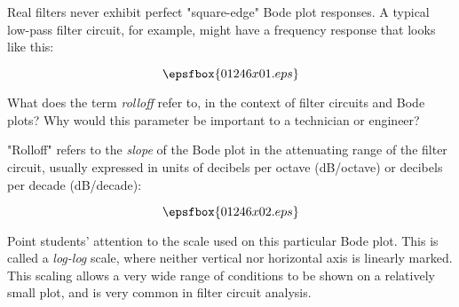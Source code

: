 

Real filters never exhibit perfect "square-edge" Bode plot responses.  A typical low-pass filter circuit, for example, might have a frequency response that looks like this:

$$\epsfbox{01246x01.eps}$$

What does the term {\it rolloff} refer to, in the context of filter circuits and Bode plots?  Why would this parameter be important to a technician or engineer?







"Rolloff" refers to the {\it slope} of the Bode plot in the attenuating range of the filter circuit, usually expressed in units of decibels per octave (dB/octave) or decibels per decade (dB/decade):

$$\epsfbox{01246x02.eps}$$







Point students' attention to the scale used on this particular Bode plot.  This is called a {\it log-log} scale, where neither vertical nor horizontal axis is linearly marked.  This scaling allows a very wide range of conditions to be shown on a relatively small plot, and is very common in filter circuit analysis.




